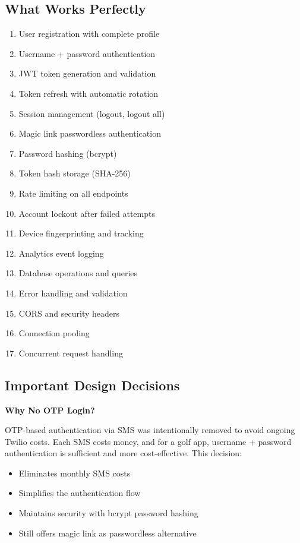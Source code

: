 \documentclass[11pt,a4paper]{article}
\begin{document}
\subsection{What Works Perfectly}
\begin{enumerate}
    \item User registration with complete profile
    \item Username + password authentication
    \item JWT token generation and validation
    \item Token refresh with automatic rotation
    \item Session management (logout, logout all)
    \item Magic link passwordless authentication
    \item Password hashing (bcrypt)
    \item Token hash storage (SHA-256)
    \item Rate limiting on all endpoints
    \item Account lockout after failed attempts
    \item Device fingerprinting and tracking
    \item Analytics event logging
    \item Database operations and queries
    \item Error handling and validation
    \item CORS and security headers
    \item Connection pooling
    \item Concurrent request handling
\end{enumerate}

\subsection{Important Design Decisions}

\textbf{Why No OTP Login?}

OTP-based authentication via SMS was intentionally removed to avoid ongoing Twilio costs. Each SMS costs money, and for a golf app, username + password authentication is sufficient and more cost-effective. This decision:
\begin{itemize}
    \item Eliminates monthly SMS costs
    \item Simplifies the authentication flow
    \item Maintains security with bcrypt password hashing
    \item Still offers magic link as passwordless alternative
\end{itemize}
\end{document}
